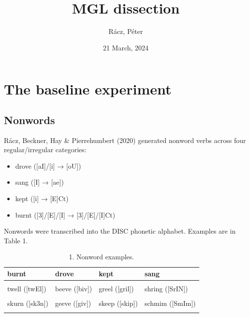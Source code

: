 \documentclass[
]{article}
\title{MGL dissection}
\author{Rácz, Péter}
\date{21 March, 2024}
\providecommand{\tightlist}{%
  \setlength{\itemsep}{0pt}\setlength{\parskip}{0pt}}
\begin{document}
\maketitle

\hypertarget{the-baseline-experiment}{%
\section{The baseline experiment}\label{the-baseline-experiment}}

\hypertarget{nonwords}{%
\subsection{Nonwords}\label{nonwords}}

Rácz, Beckner, Hay \& Pierrehumbert (2020) generated nonword verbs
across four regular/irregular categories:

\begin{itemize}
\tightlist
\item
  drove ({[}aI{]}/{[}i{]} → {[}oU{]})
\item
  sang ({[}I{]} → {[}ae{]})
\item
  kept ({[}i{]} → {[}E{]}Ct)
\item
  burnt ({[}3{]}/{[}E{]}/{[}I{]} → {[}3{]}/{[}E{]}/{[}I{]}Ct)
\end{itemize}

Nonwords were transcribed into the DISC phonetic alphabet. Examples are
in Table 1.

\begin{table}
\centering
\caption{\label{tab:examples}1. Nonword examples.}
\centering
\begin{tabular}[t]{llll}
\toprule
burnt & drove & kept & sang\\
\midrule
\cellcolor{gray!10}{sprurn ([spr3n])} & \cellcolor{gray!10}{sline ([sl2n])} & \cellcolor{gray!10}{neem ([nim])} & \cellcolor{gray!10}{glink ([glINk])}\\
twell ([twEl]) & beeve ([biv]) & greel ([gril]) & shring ([SrIN])\\
\cellcolor{gray!10}{vurn ([v3n])} & \cellcolor{gray!10}{twite ([tw2t])} & \cellcolor{gray!10}{breep ([brip])} & \cellcolor{gray!10}{frim ([frIm])}\\
skurn ([sk3n]) & geeve ([giv]) & skeep ([skip]) & schmim ([SmIm])\\
\cellcolor{gray!10}{surn ([s3n])} & \cellcolor{gray!10}{zite ([z2t])} & \cellcolor{gray!10}{fleel ([flil])} & \cellcolor{gray!10}{gim ([gIm])}\\
\bottomrule
\end{tabular}
\end{table}
\end{document}
